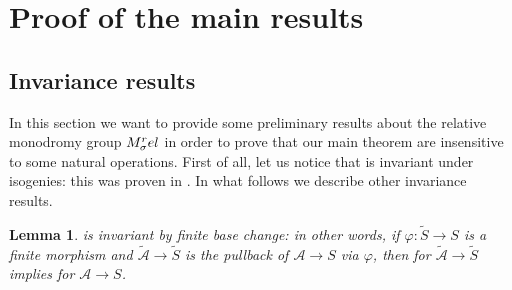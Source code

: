 \documentclass[10 pt,a4paper]{article}
\theoremstyle{plain}
\newtheorem{lem}[thm]{Lemma}
\theoremstyle{definition}
\theoremstyle{named}
\newcommand{\cA}{\mathcal A}
\newcommand{\bC}{\mathbb C}
\begin{document}
\section{Proof of the main results}\label{section3}

\subsection{Invariance results}\label{section3.1}

In this section we want to provide some preliminary results about the relative monodromy group $M_\sigma^\textnormal{rel}$ in order to prove that our main theorem are insensitive to some natural operations. First of all, let us notice that  is invariant under isogenies: this was proven in \cite[Theorem 3.6]{T1}. In what follows we describe other invariance results.

\begin{lem}\label{baseChange}
	 is invariant by finite base change: in other words, if $\varphi: \widetilde{S} \rightarrow S$ is a finite morphism and $\widetilde{\cA} \to \widetilde{S}$ is the pullback of $\cA\rightarrow S$ via $\varphi$, then   for $\widetilde{\cA} \rightarrow \widetilde{S}$ implies   for $\cA \rightarrow S$.
\end{lem}
\end{document}
